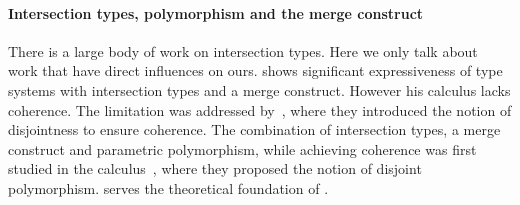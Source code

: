 




\paragraph{Intersection types, polymorphism and the merge construct}

There is a large body of work on intersection types. Here we only talk about
work that have direct influences on ours. \citet{dunfield2014elaborating} shows
significant expressiveness of type systems with intersection types and a merge
construct. However his calculus lacks coherence. The limitation was addressed
by~\citet{oliveira2016disjoint}, where they introduced the notion of
disjointness to ensure coherence. The combination of intersection types, a merge
construct and parametric polymorphism, while achieving coherence was first
studied in the \bname calculus~\cite{alpuimdisjoint}, where they proposed the
notion of disjoint polymorphism. \bname serves the theoretical foundation of
\name.


